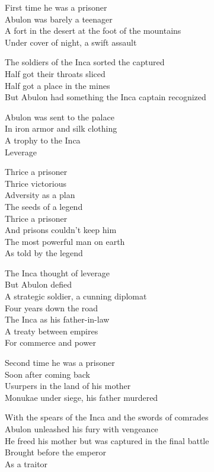 \begin{lyrics}
First time he was a prisoner\\
Abulon was barely a teenager\\
A fort in the desert at the foot of the mountains\\
Under cover of night, a swift assault

The soldiers of the Inca sorted the captured\\
Half got their throats sliced\\
Half got a place in the mines\\
But Abulon had something the Inca captain recognized

Abulon was sent to the palace\\
In iron armor and silk clothing\\
A trophy to the Inca\\
Leverage

Thrice a prisoner\\
Thrice victorious\\
Adversity as a plan\\
The seeds of a legend\\
Thrice a prisoner\\
And prisons couldn’t keep him\\
The most powerful man on earth\\
As told by the legend

The Inca thought of leverage\\
But Abulon defied\\
A strategic soldier, a cunning diplomat\\
Four years down the road\\
The Inca as his father-in-law\\
A treaty between empires\\
For commerce and power

Second time he was a prisoner\\
Soon after coming back\\
Usurpers in the land of his mother\\
Monukae under siege, his father murdered

With the spears of the Inca and the swords of comrades\\
Abulon unleashed his fury with vengeance\\
He freed his mother but was captured in the final battle\\
Brought before the emperor\\
As a traitor


\end{lyrics}
